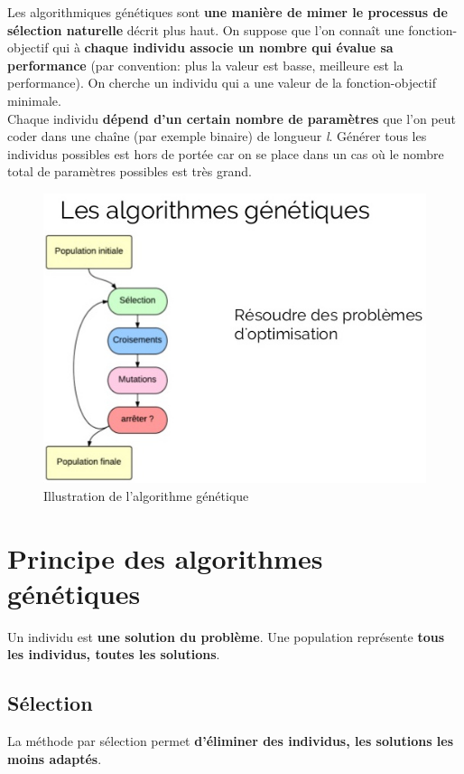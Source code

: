 \documentclass[a4paper,10pt]{report}
\begin{document}
Les algorithmiques génétiques sont \textbf{une manière de mimer le processus de sélection naturelle} décrit plus haut. On suppose que
l'on connaît une fonction-objectif qui à \textbf{chaque individu associe un nombre qui évalue sa performance} (par convention: plus 
la valeur est basse, meilleure est la performance). On cherche un individu qui a une valeur de la fonction-objectif minimale. \\
Chaque individu \textbf{dépend d'un certain nombre de paramètres} que l'on peut coder dans une chaîne (par exemple binaire) de longueur
\textit{l}. Générer tous les individus possibles est hors de portée car on se place dans un cas où le nombre total
de paramètres possibles est très grand.

\begin{figure}
\includegraphics[scale=0.74]{img/algo-genetic}
\caption{Illustration de l'algorithme génétique}
\end{figure}

\chapter*{Principe des algorithmes génétiques}

Un individu est \textbf{une solution du problème}. Une population représente \textbf{tous les individus, toutes les solutions}.


\section*{Sélection}

La méthode par sélection permet \textbf{d'éliminer des individus, les solutions les moins adaptés}.
\end{document}
